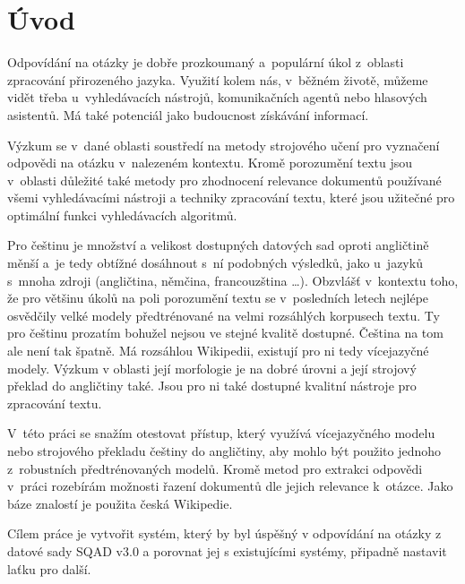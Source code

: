 
\chapter{Úvod}
Odpovídání na otázky je dobře prozkoumaný a~populární úkol z~oblasti zpracování přirozeného jazyka. Využití kolem nás, v~běžném životě, můžeme vidět třeba u~vyhledávacích nástrojů, komunikačních agentů nebo hlasových asistentů. Má také potenciál jako budoucnost získávání informací.\par 
Výzkum se v~dané oblasti soustředí na metody strojového učení pro vyznačení odpovědi na otázku v~nalezeném kontextu. Kromě porozumění textu jsou v~oblasti důležité také metody pro zhodnocení relevance dokumentů používané všemi vyhledávacími nástroji a techniky zpracování textu, které jsou užitečné pro optimální funkci vyhledávacích algoritmů.\par
Pro češtinu je množství a velikost dostupných datových sad oproti angličtině měnší a~je tedy obtížné dosáhnout s~ní podobných výsledků, jako u~jazyků s~mnoha zdroji (angličtina, němčina, francouzština \dots). Obzvlášť v~kontextu toho, že pro většinu úkolů na poli porozumění textu se v~posledních letech nejlépe osvědčily velké modely předtrénované na velmi rozsáhlých korpusech textu. Ty pro češtinu prozatím bohužel nejsou ve stejné kvalitě dostupné. Čeština na tom ale není tak špatně. Má rozsáhlou Wikipedii, existují pro ni tedy vícejazyčné modely. Výzkum v oblasti její morfologie je na dobré úrovni a její strojový překlad do angličtiny také. Jsou pro ni také dostupné kvalitní nástroje pro zpracování textu.\par \smallskip
V~této práci se snažím otestovat přístup, který využívá vícejazyčného modelu nebo strojového překladu češtiny do angličtiny, aby mohlo být použito jednoho z~robustních předtrénovaných modelů. Kromě metod pro extrakci odpovědi v~práci rozebírám možnosti řazení dokumentů dle jejich relevance k~otázce. Jako báze znalostí je použita česká Wikipedie.\par
Cílem práce je vytvořit systém, který by byl úspěšný v odpovídání na otázky z datové sady SQAD v3.0 a porovnat jej s existujícími systémy, připadně nastavit laťku pro další.\par \smallskip
